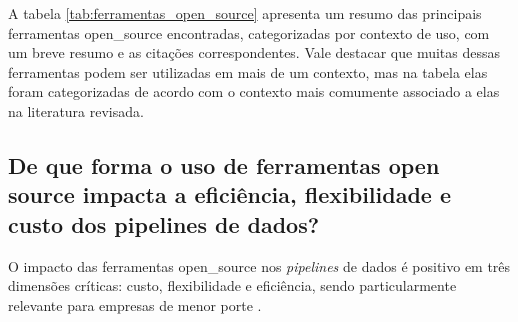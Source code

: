 A tabela \ref{tab:ferramentas_open_source} apresenta um resumo das principais ferramentas \acs{open_source} encontradas, categorizadas por contexto de uso, com um breve resumo e as citações correspondentes. Vale destacar que muitas dessas ferramentas podem ser utilizadas em mais de um contexto, mas na tabela elas foram categorizadas de acordo com o contexto mais comumente associado a elas na literatura revisada.




\subsection{De que forma o uso de ferramentas open source impacta a eficiência, flexibilidade e custo dos pipelines de dados?}
\label{sec:respostas:impacto}

O impacto das ferramentas \acs{open_source} nos \textit{pipelines} de dados é positivo em três dimensões críticas: custo, flexibilidade e eficiência, sendo particularmente relevante para empresas de menor porte \cite[]{septian2019}.

